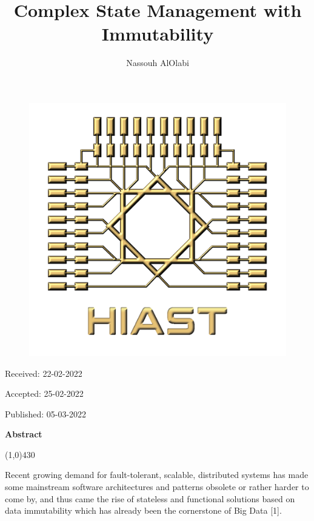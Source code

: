 \documentclass[12pt,twoside]{article}
\title{\Huge{Complex State Management with Immutability}}
\author{Nassouh AlOlabi} \affil{Supervised By: Dr.Yasser Rahal, Fahmi Alammareen}
\date{}
\makeatletter
\def\maketitle{{%
		\renewenvironment{tabular}[2][]
		{\begin{flushleft}}
			{\end{flushleft}}
		\AB@maketitle}}
\makeatother
\begin{document}

\begin{figure}
    {\includegraphics[scale=.25]{logo.png}}
\end{figure}

\maketitle

\thispagestyle{first}

\vspace{0.5cm}

\hfill Received: 22-02-2022 

\hfill Accepted: 25-02-2022

\hfill Published: 05-03-2022

\vspace{1cm}


\vspace{1.5cm}

\noindent \textbf{Abstract}
\begin{center}
 	\line(1,0){430}
\end{center}
\vspace{-0,3cm}
\noindent Recent growing demand for fault-tolerant, scalable, distributed systems has made some mainstream software architectures and patterns obsolete or rather harder to come by, and thus came the rise of stateless and functional solutions based on data immutability which has already been the cornerstone of Big Data [1].
\end{document}
